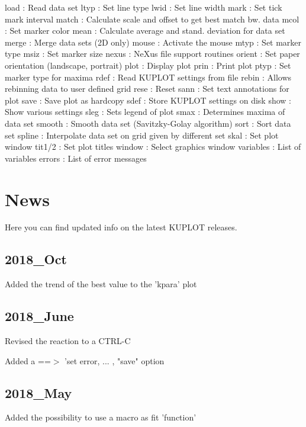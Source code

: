 \begin{MacVerbatim}
load          : Read data set
ltyp          : Set line type
lwid          : Set line width
mark          : Set tick mark interval
match         : Calculate scale and offset to get best match bw. data
mcol          : Set marker color
mean          : Calculate average and stand. deviation for data set
merge         : Merge data sets (2D only)
mouse         : Activate the mouse
mtyp          : Set marker type
msiz          : Set marker size
nexus         : NeXus file support routines
orient        : Set paper orientation (landscape, portrait)
plot          : Display plot
prin          : Print plot
ptyp          : Set marker type for maxima
rdef          : Read KUPLOT settings from file
rebin         : Allows rebinning data to user defined grid
rese          : Reset
sann          : Set text annotations for plot
save          : Save plot as hardcopy
sdef          : Store KUPLOT settings on disk
show          : Show various settings
sleg          : Sets legend of plot
smax          : Determines maxima of data set
smooth        : Smooth data set (Savitzky-Golay algorithm)
sort          : Sort data set
spline        : Interpolate data set on grid given by different set
skal          : Set plot window
tit1/2        : Set plot titles
window        : Select graphics window
variables     : List of variables
errors        : List of error messages
\end{MacVerbatim}
\section{News}
\par
Here you can find updated info on the latest KUPLOT releases. 
\subsection*{2018\_Oct}
\par
Added the trend of the best value to the 'kpara' plot 
\subsection*{2018\_June}
\par
Revised the reaction to a CTRL-C 
\par
Added a ==$> $ 'set error, ... , "save" option 
\subsection*{2018\_May}
\par
Added the possibility to use a macro as fit 'function' 
